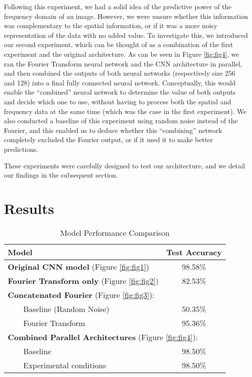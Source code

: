 Following this experiment, we had a solid idea of the predictive power of the frequency domain of an image. However, we were unsure whether this information was complementary to the spatial information, or if it was a more noisy representation of the data with no added value. To investigate this, we introduced our second experiment, which can be thought of as a combination of the first experiment and the original architecture. As can be seen in Figure \ref{fig:fig4}, we ran the Fourier Transform neural network and the CNN architecture in parallel, and then combined the outputs of both neural networks (respectively size 256 and 128) into a final fully connected neural network. Conceptually, this would enable the “combined” neural network to determine the value of both outputs and decide which one to use, without having to process both the spatial and frequency data at the same time (which was the case in the first experiment). We also conducted a baseline of this experiment using random noise instead of the Fourier, and this enabled us to deduce whether this “combining” network completely excluded the Fourier output, or if it used it to make better predictions.

These experiments were carefully designed to test our architecture, and we detail our findings in the subsequent section.


\section{Results}

\begin{table}[h]
    \centering
    \begin{tabular}{|l|c|}
    \hline
    \textbf{Model} & \textbf{Test Accuracy} \\
    \hline
    \textbf{Original CNN model} (Figure \ref{fig:fig1}) & 98.58\% \\
    \hline
    \textbf{Fourier Transform only} (Figure \ref{fig:fig2}) & 82.53\% \\
    \hline
    \multicolumn{2}{|l|}{\textbf{Concatenated Fourier} (Figure \ref{fig:fig3}):} \\
    \hline
    ~~~~Baseline (Random Noise) & 50.35\% \\
    ~~~~Fourier Transform & 95.36\% \\
    \hline
    \multicolumn{2}{|l|}{\textbf{Combined Parallel Architectures} (Figure \ref{fig:fig4}):} \\
    \hline
    ~~~~Baseline & 98.50\% \\
    ~~~~Experimental conditions & 98.50\% \\
    \hline
    \end{tabular}
    \caption{Model Performance Comparison}
    \label{tab:model-comparison}
\end{table}

